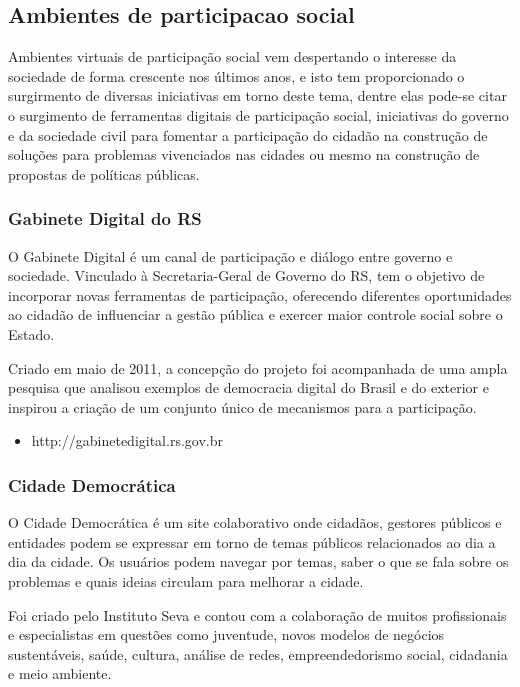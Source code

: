 \documentclass[12pt]{article}
\begin{document}
\subsection{Ambientes de participacao social}

Ambientes virtuais de participação social vem despertando o interesse da
sociedade de forma crescente nos últimos anos, e isto tem proporcionado o
surgirmento de diversas iniciativas em torno deste tema, dentre elas pode-se
citar o surgimento de ferramentas digitais de participação social, iniciativas
do governo e da sociedade civil para fomentar a participação do cidadão na
construção de soluções para problemas vivenciados nas cidades ou mesmo na
construção de propostas de políticas públicas.

\subsubsection{Gabinete Digital do RS}

O Gabinete Digital é um canal de participação e diálogo entre governo e
sociedade. Vinculado à Secretaria-Geral de Governo do RS, tem o objetivo de
incorporar novas ferramentas de participação, oferecendo diferentes
oportunidades ao cidadão de influenciar a gestão pública e exercer maior
controle social sobre o Estado.

Criado em maio de 2011, a concepção do projeto foi acompanhada de uma ampla
pesquisa que analisou exemplos de democracia digital do Brasil e do exterior e
inspirou a criação de um conjunto único de mecanismos para a participação.

\begin{itemize}
  \item http://gabinetedigital.rs.gov.br
\end{itemize}

\subsubsection{Cidade Democrática}

O Cidade Democrática é um site colaborativo onde cidadãos, gestores públicos e
entidades podem se expressar em torno de temas públicos relacionados ao dia a
dia da cidade. Os usuários podem navegar por temas, saber o que se fala sobre
os problemas e quais ideias circulam para melhorar a cidade.

Foi criado pelo Instituto Seva e contou com a
colaboração de muitos profissionais e especialistas em questões como
juventude, novos modelos de negócios sustentáveis, saúde, cultura, análise de
redes, empreendedorismo social, cidadania e meio ambiente.
\end{document}
